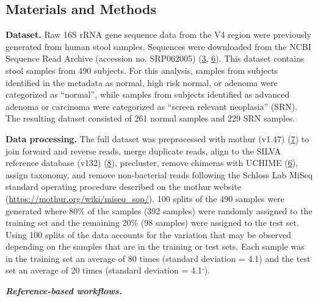 \documentclass[
]{article}
\begin{document}
\hypertarget{materials-and-methods}{%
\subsection{Materials and Methods}\label{materials-and-methods}}

\textbf{Dataset.} Raw 16S rRNA gene sequence data from the V4 region
were previously generated from human stool samples. Sequences were
downloaded from the NCBI Sequence Read Archive (accession no. SRP062005)
(\protect\hyperlink{ref-baxter2016}{3},
\protect\hyperlink{ref-edgar2011}{6}). This dataset contains stool
samples from 490 subjects. For this analysis, samples from subjects
identified in the metadata as normal, high risk normal, or adenoma were
categorized as ``normal'', while samples from subjects identified as
advanced adenoma or carcinoma were categorized as ``screen relevant
neoplasia'' (SRN). The resulting dataset consisted of 261 normal samples
and 229 SRN samples.

\textbf{Data processing.} The full dataset was preprocessed with mothur
(v1.47) (\protect\hyperlink{ref-schloss2009}{7}) to join forward and
reverse reads, merge duplicate reads, align to the SILVA reference
database (v132) (\protect\hyperlink{ref-quast2013}{8}), precluster,
remove chimeras with UCHIME (\protect\hyperlink{ref-edgar2011}{6}),
assign taxonomy, and remove non-bacterial reads following the Schloss
Lab MiSeq standard operating procedure described on the mothur website
(\url{https://mothur.org/wiki/miseq_sop/}). 100 splits of the 490
samples were generated where 80\% of the samples (392 samples) were
randomly assigned to the training set and the remaining 20\% (98
samples) were assigned to the test set. Using 100 splits of the data
accounts for the variation that may be observed depending on the samples
that are in the training or test sets. Each sample was in the training
set an average of 80 times (standard deviation = 4.1) and the test set
an average of 20 times (standard deviation = 4.1`).

\textbf{\emph{Reference-based workflows.}}
\end{document}
